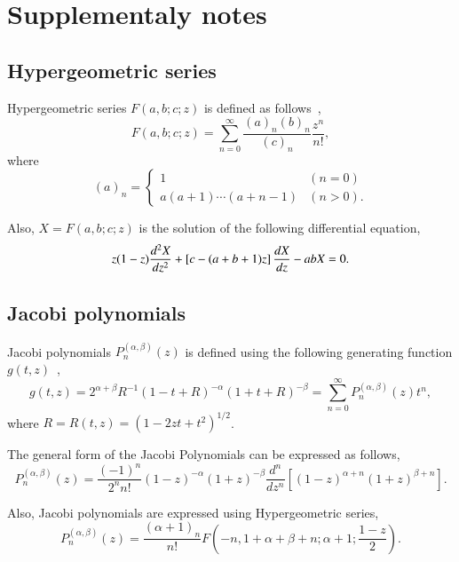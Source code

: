 \documentclass{article}
\begin{document}
\section{Supplementaly notes}
\subsection{Hypergeometric series}
Hypergeometric series $F(a,b;c;z)$ is defined as follows~\cite{olver2010nist},
\begin{equation}
 F(a,b;c;z) = \sum_{n=0}^{\infty} \frac{(a)_n (b)_n}{(c)_n}\frac{z^n}{n!},
\end{equation}
where
\begin{equation}
 (a)_n = \begin{cases}
          1 & (n=0)\\
          a (a+1) \cdots (a+n-1)& (n>0).
         \end{cases}
\end{equation}

Also, $X = F(a,b;c;z)$ is the solution of the following differential equation,
\begin{equation}
 z(1-z)\frac{d^2 X}{d z^2} + \left[ c - (a+b+1)z \right] \frac{d {X}}{d {z}} - ab X = 0.\label{hypgeo_concrete}
\end{equation}

\subsection{Jacobi polynomials}
Jacobi polynomials $P^{(\alpha,\beta)}_{n} (z)$ is defined using the following generating function $g(t,z)$~\cite{olver2010nist},
\begin{equation}
 g(t,z) = 2^{\alpha+\beta} R^{-1} (1-t+R)^{-\alpha} (1+t+R)^{-\beta} = \sum_{n=0}^{\infty} P^{(\alpha,\beta)}_{n} (z) t^n,
\end{equation}
where $R = R(t,z) = \left(1 - 2zt + t^2\right)^{1/2}$.

The general form of the Jacobi Polynomials can be expressed as follows,
\begin{equation}
 P^{(\alpha, \beta)}_n (z) = \frac{(-1)^n}{2^n n!} (1-z)^{-\alpha} (1+z)^{-\beta} \frac{d^n}{dz^n}\left[(1-z)^{\alpha+n} (1+z)^{\beta+n}\right].
\end{equation}

Also, Jacobi polynomials are expressed using Hypergeometric series,
\begin{equation}
 P^{(\alpha,\beta)}_{n} (z) = \frac{(\alpha+1)_n}{n!} F \left(-n, 1+\alpha+\beta+n; \alpha+1; \frac{1-z}{2}\right).
\end{equation}
\end{document}
